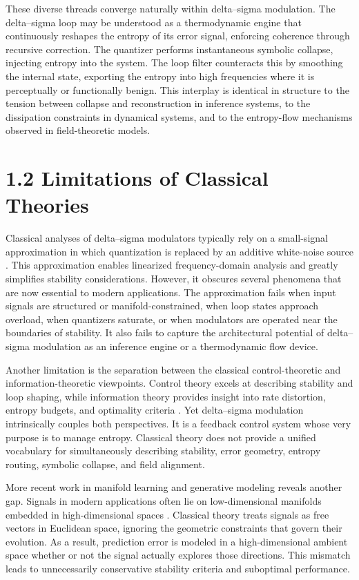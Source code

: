 These diverse threads converge naturally within delta--sigma modulation. The delta--sigma loop may be understood as a thermodynamic engine that continuously reshapes the entropy of its error signal, enforcing coherence through recursive correction. The quantizer performs instantaneous symbolic collapse, injecting entropy into the system. The loop filter counteracts this by smoothing the internal state, exporting the entropy into high frequencies where it is perceptually or functionally benign. This interplay is identical in structure to the tension between collapse and reconstruction in inference systems, to the dissipation constraints in dynamical systems, and to the entropy-flow mechanisms observed in field-theoretic models.

\section*{1.2 Limitations of Classical Theories}

Classical analyses of delta--sigma modulators typically rely on a small-signal approximation in which quantization is replaced by an additive white-noise source \citep{schreier2005understanding}. This approximation enables linearized frequency-domain analysis and greatly simplifies stability considerations. However, it obscures several phenomena that are now essential to modern applications. The approximation fails when input signals are structured or manifold-constrained, when loop states approach overload, when quantizers saturate, or when modulators are operated near the boundaries of stability. It also fails to capture the architectural potential of delta--sigma modulation as an inference engine or a thermodynamic flow device.

Another limitation is the separation between the classical control-theoretic and information-theoretic viewpoints. Control theory excels at describing stability and loop shaping, while information theory provides insight into rate distortion, entropy budgets, and optimality criteria \citep{cover2006elements}. Yet delta--sigma modulation intrinsically couples both perspectives. It is a feedback control system whose very purpose is to manage entropy. Classical theory does not provide a unified vocabulary for simultaneously describing stability, error geometry, entropy routing, symbolic collapse, and field alignment.

More recent work in manifold learning and generative modeling reveals another gap. Signals in modern applications often lie on low-dimensional manifolds embedded in high-dimensional spaces \citep{li2025jit}. Classical theory treats signals as free vectors in Euclidean space, ignoring the geometric constraints that govern their evolution. As a result, prediction error is modeled in a high-dimensional ambient space whether or not the signal actually explores those directions. This mismatch leads to unnecessarily conservative stability criteria and suboptimal performance.

